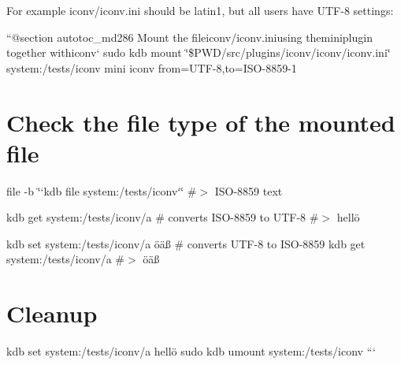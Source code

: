 For example {\ttfamily iconv/iconv.\+ini} should be {\ttfamily latin1}, but all users have {\ttfamily U\+T\+F-\/8} settings\+:

``{\ttfamily  @section autotoc\+\_\+md286 Mount the file}iconv/iconv.\+ini{\ttfamily using the}mini{\ttfamily plugin together with}iconv` sudo kdb mount \char`\"{}\$\+P\+W\+D/src/plugins/iconv/iconv/iconv.\+ini\char`\"{} system\+:/tests/iconv mini iconv from=U\+T\+F-\/8,to=I\+S\+O-\/8859-\/1\hypertarget{autotoc_md283_autotoc_md287}{}\section{Check the file type of the mounted file}\label{autotoc_md283_autotoc_md287}
file -\/b \char`\"{}`kdb file system\+:/tests/iconv`\char`\"{} \#$>$ I\+S\+O-\/8859 text

kdb get system\+:/tests/iconv/a \# converts I\+S\+O-\/8859 to U\+T\+F-\/8 \#$>$ hellö

kdb set system\+:/tests/iconv/a öäß \# converts U\+T\+F-\/8 to I\+S\+O-\/8859 kdb get system\+:/tests/iconv/a \#$>$ öäß\hypertarget{autotoc_md283_autotoc_md288}{}\section{Cleanup}\label{autotoc_md283_autotoc_md288}
kdb set system\+:/tests/iconv/a hellö sudo kdb umount system\+:/tests/iconv ``` 